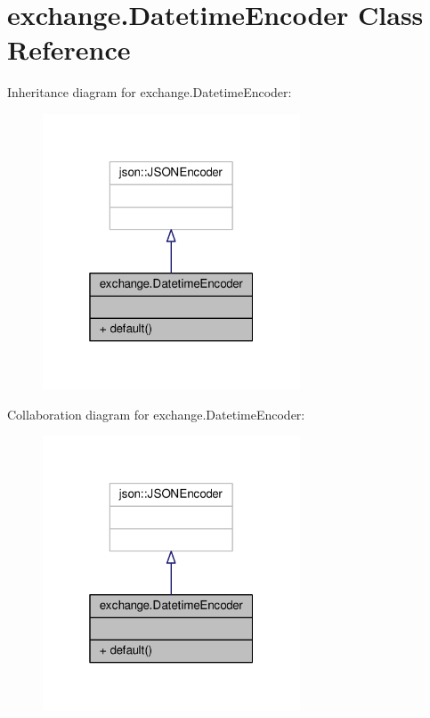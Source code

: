 \hypertarget{classexchange_1_1_datetime_encoder}{}\section{exchange.\+Datetime\+Encoder Class Reference}
\label{classexchange_1_1_datetime_encoder}


Inheritance diagram for exchange.\+Datetime\+Encoder\+:
\nopagebreak
\begin{figure}[H]
\begin{center}
\leavevmode
\includegraphics[width=217pt]{classexchange_1_1_datetime_encoder__inherit__graph}
\end{center}
\end{figure}


Collaboration diagram for exchange.\+Datetime\+Encoder\+:
\nopagebreak
\begin{figure}[H]
\begin{center}
\leavevmode
\includegraphics[width=217pt]{classexchange_1_1_datetime_encoder__coll__graph}
\end{center}
\end{figure}

